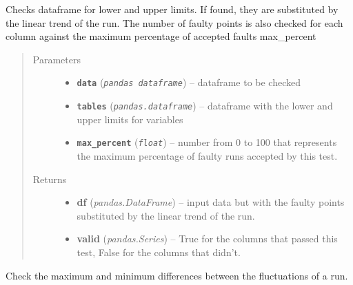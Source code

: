 \documentclass[a4paper,10pt,oneside]{sphinxmanual}
\begin{document}
\begin{fulllineitems}
\label{pymicra:pymicra.tests.check_limits}
Checks dataframe for lower and upper limits. If found, they are substituted by
the linear trend of the run. The number of faulty points is also checked for each
column against the maximum percentage of accepted faults max\_percent
\begin{quote}\begin{description}
\item[{Parameters}] \leavevmode\begin{itemize}
\item {} 
\textbf{\texttt{data}} (\emph{\texttt{pandas dataframe}}) -- dataframe to be checked

\item {} 
\textbf{\texttt{tables}} (\emph{\texttt{pandas.dataframe}}) -- dataframe with the lower and upper limits for variables

\item {} 
\textbf{\texttt{max\_percent}} (\emph{\texttt{float}}) -- number from 0 to 100 that represents the maximum percentage of faulty
runs accepted by this test.

\end{itemize}

\item[{Returns}] \leavevmode
\begin{itemize}
\item {} 
\textbf{df} (\emph{pandas.DataFrame}) -- input data but with the faulty points substituted by the linear trend of the run.

\item {} 
\textbf{valid} (\emph{pandas.Series}) -- True for the columns that passed this test, False for the columns that didn't.

\end{itemize}


\end{description}\end{quote}

\end{fulllineitems}


\begin{fulllineitems}
\label{pymicra:pymicra.tests.check_maxdif}
Check the maximum and minimum differences between the fluctuations of a run.

\end{fulllineitems}
\end{document}
